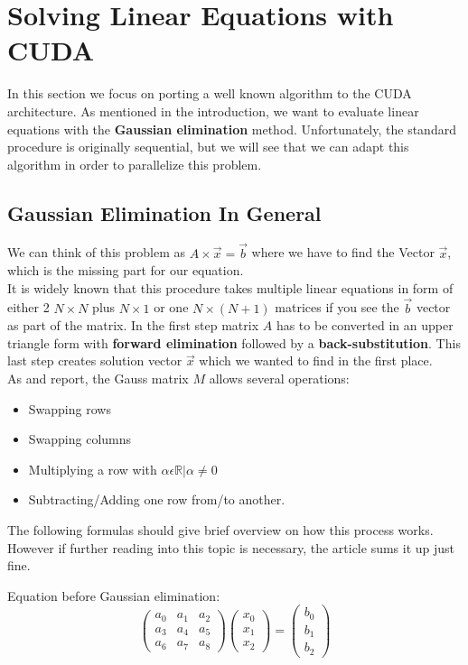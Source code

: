 \documentclass[draft, final]{vutinfth} %
\begin{document}
\chapter{Solving Linear Equations with CUDA}
	In this section we focus on porting a well known algorithm to the CUDA architecture. As mentioned in the introduction, we want to evaluate linear equations with the \textbf{Gaussian elimination} method. Unfortunately, the standard procedure is originally sequential, but we will see that we can adapt this algorithm in order to parallelize this problem.

	\section{Gaussian Elimination In General}
		We can think of this problem as $A \times \vec{x} = \vec{b}$ where we have to find the Vector $\vec{x}$, which is the missing part for our equation.\\
		It is widely known that this procedure takes multiple linear equations in form of either 2 $N\times N$ plus $N\times 1$ or one $N\times (N+1)$ matrices if you see the $\vec{b}$ vector as part of the matrix. 
		In the first step matrix $A$ has to be converted in an upper triangle form with \textbf{forward elimination} followed by a \textbf{back-substitution}. This last step creates solution vector $\vec{x}$ which we wanted to find in the first place.\\
		As \cite{Grcar2011163} and \cite{wiki:gaussian} report, the Gauss matrix $M$ allows several operations:
		\begin{itemize}
			\item Swapping rows
			\item Swapping columns
			\item Multiplying a row with $\alpha \epsilon \mathbb{R} | \alpha \neq 0$
			\item Subtracting/Adding one row from/to another.
		\end{itemize}
		The following formulas should give brief overview on how this process works. However if further reading into this topic is necessary, the article \cite{wiki:gaussian} sums it up just fine.

		Equation before Gaussian elimination:
		\begin{equation}
			\begin{pmatrix}
			 a_{0} &  a_{1} & a_{2} \\ 
			 a_{3} &  a_{4} & a_{5} \\ 
			 a_{6} &  a_{7} & a_{8} 
			\end{pmatrix}
			\begin{pmatrix}
			 x_{0}\\ 
			 x_{1}\\ 
			 x_{2}
			\end{pmatrix}
			=
			\begin{pmatrix}
			 b_{0}\\ 
			 b_{1}\\ 
			 b_{2}
			\end{pmatrix}
		\end{equation}
\end{document}
